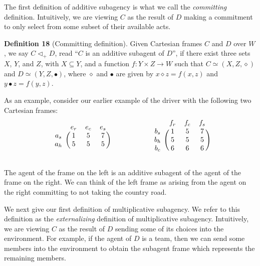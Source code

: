 \documentclass{article}
\begin{document}
The first definition of additive subagency is what we call the \emph{committing} definition.
Intuitively, we are viewing $C$ as the result of $D$ making a commitment to only select from some subset of their available acts. 

\bigskip
\noindent \textbf{Definition 18} (Committing definition).
Given Cartesian frames $C$ and $D$ over $W$, we say $C \triangleleft_{+} D$, read ``$C$ is an additive subagent of $D$'', if there exist three sets $X$, $Y$, and $Z$, with $X \subseteq Y$, and a function $f : Y \times Z \to W$ such that $C \simeq (X, Z, \diamond)$ and $D \simeq (Y, Z, \bullet)$, where $\diamond$ and $\bullet$ are given by $x \diamond z = f(x, z)$ and $y \bullet z = f(y, z)$.

\bigskip
\noindent As an example, consider our earlier example of the driver with the following two Cartesian frames:
\[
\begin{blockarray}{cccc}
& e_r & e_c & e_s\\
\begin{block}{c(ccc)}
a_s & 1 & 5 & 7\\
a_h & 5 & 5 & 5\\
\end{block}
\end{blockarray}
\hspace{2cm}
\begin{blockarray}{cccc}
& f_r & f_c & f_s\\
\begin{block}{c(ccc)}
b_s & 1 & 5 & 7\\
b_h & 5 & 5 & 5\\
b_c & 6 & 6 & 6\\
\end{block}
\end{blockarray}
\]

\noindent The agent of the frame on the left is an additive subagent of the agent of the frame on the right. We can think of the left frame as arising from the agent on the right committing to not taking the country road. 

\bigskip
\noindent We next give our first definition of multiplicative subagency.
We refer to this definition as the \emph{externalizing} definition of multiplicative subagency.
Intuitively, we are viewing $C$ as the result of $D$ sending some of its choices into the environment.
For example, if the agent of $D$ is a team, then we can send some members into the environment to obtain the subagent frame which represents the remaining members.
\end{document}
